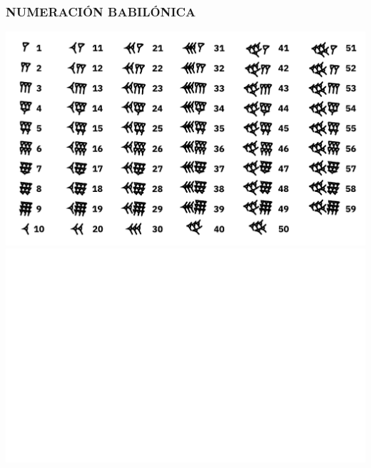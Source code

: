 \begin{frame}
  \frametitle{NUMERACIÓN BABILÓNICA}

  \begin{center}
    \ifdefined\handout
    \includegraphics[width=\textwidth]{babylonian-white.pdf}
    \else
    \includegraphics[width=\textwidth]{babylonian.pdf}
    \fi
  \end{center}
\end{frame}

